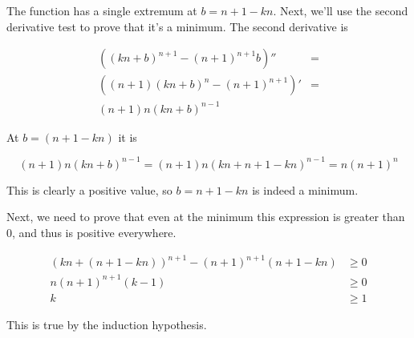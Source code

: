 \begin{description}
The function has a single extremum at $b = n + 1 - kn$. Next, we'll use the
second derivative test to prove that it's a minimum. The second derivative is

\begin{align*}
\left((kn + b)^{n+1} - (n+1)^{n+1} b\right)'' &= \\
\left((n+1) (kn+b)^n - (n+1)^{n+1}\right)' &= \\
(n+1) n (kn+b)^{n-1}
\end{align*}

At $b = (n + 1 - kn)$ it is

$$(n+1) n (kn +b)^{n-1} = (n+1)n(kn + n + 1 - kn)^{n-1} = n (n+1)^n$$

This is clearly a positive value, so $b = n + 1 - kn$ is indeed a minimum.

Next, we need to prove that even at the minimum this expression is greater
than $0$, and thus is positive everywhere.

\begin{align*}
(kn + (n + 1 - kn))^{n+1} - (n+1)^{n+1} (n + 1 - kn) &\ge 0 \\
n (n + 1)^{n+1} (k - 1) &\ge 0 \\
k &\ge 1
\end{align*}

This is true by the induction hypothesis.

\end{description}
